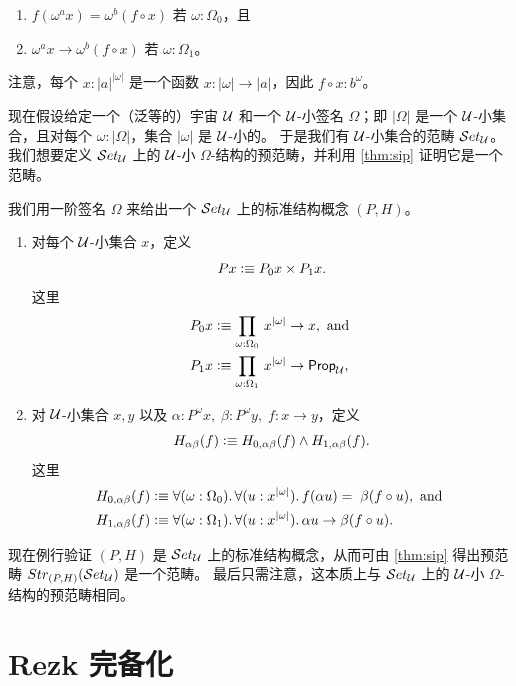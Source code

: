 \begin{enumerate}
\item $f(\omega^ax) = \omega^b(f\circ x)$ 若 $\omega:\Omega_0$，且
\item $\omega^ax\to\omega^b(f\circ x)$ 若 $\omega:\Omega_1$。
\end{enumerate}

注意，每个 $x:|a|^{|\omega|}$ 是一个函数 $x:|\omega|\to |a|$，因此 $f\circ x : b^\omega$。

现在假设给定一个（泛等的）宇宙 $\mathcal{U}$ 和一个 $\mathcal{U}$-小签名 $\Omega$；即 $|\Omega|$ 是一个 $\mathcal{U}$-小集合，且对每个 $\omega:|\Omega|$，集合 $|\omega|$ 是 $\mathcal{U}$-小的。
于是我们有 $\mathcal{U}$-小集合的范畴 $\mathcal{S}et_{\mathcal{U}}$。我们想要定义 $\mathcal{S}et_{\mathcal{U}}$ 上的 $\mathcal{U}$-小 $\Omega$-结构的预范畴，并利用 \cref{thm:sip} 证明它是一个范畴。

我们用一阶签名 $\Omega$ 来给出一个 $\mathcal{S}et_{\mathcal{U}}$ 上的标准结构概念 $(P,H)$。

\begin{defn}\label{defn:fo-notion-of-structure}
\mbox{}
\begin{enumerate}
\item 对每个 $\mathcal{U}$-小集合 $x$，定义
  \[ Px \vcentcolon\equiv P_0x\times P_1x.\]
  这里
  \begin{align*}
    P_0x &\defeq \prd{\omega:\Omega_0} x^{|\omega|}\to x, \mbox{ and } \\
    P_1x &\defeq \prd{\omega:\Omega_1} x^{|\omega|}\to \propU,
  \end{align*}
\item 对 $\mathcal{U}$-小集合 $x,y$ 以及
  $\alpha:P^\omega x,\;\beta:P^\omega y,\; f:x\to y$，定义
  \[ H_{\alpha\beta}(f) \vcentcolon\equiv H_{0,\alpha\beta}(f)\wedge H_{1,\alpha\beta}(f).\]
  这里
  \begin{align*}
    H_{0,\alpha\beta}(f) &\defeq
    \fall{\omega:\Omega_0}{u:x^{|\omega|}} f(\alpha u)=\;\beta(f\circ u),
    \mbox{ and }\\
    H_{1,\alpha\beta}(f) &\defeq
    \fall{\omega:\Omega_1}{u:x^{|\omega|}} \alpha u\to\beta(f\circ u).
  \end{align*}
\end{enumerate}
\end{defn}

现在例行验证 $(P,H)$ 是 $\mathcal{S}et_{\mathcal{U}}$ 上的标准结构概念，从而可由 \cref{thm:sip} 得出预范畴 $Str_{(P,H)}(\mathcal{S}et_{\mathcal{U}})$ 是一个范畴。
最后只需注意，这本质上与 $\mathcal{S}et_{\mathcal{U}}$ 上的 $\mathcal{U}$-小 $\Omega$-结构的预范畴相同。

\section{Rezk 完备化}
\label{sec:rezk}

